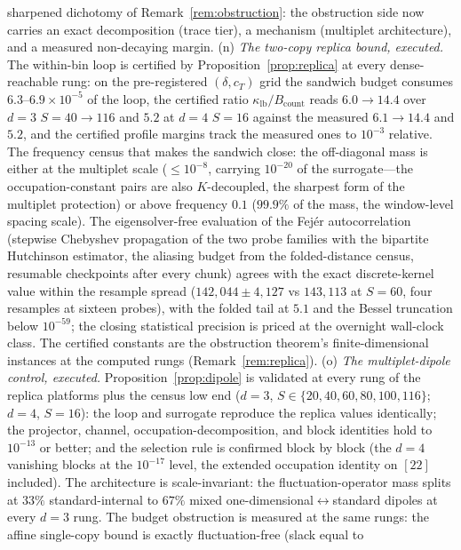 \begin{remark}
sharpened dichotomy of Remark~\ref{rem:obstruction}: the obstruction
side now carries an exact decomposition (trace tier), a mechanism
(multiplet architecture), and a measured non-decaying margin.
(n) \emph{The two-copy replica bound, executed.} The within-bin loop is
certified by Proposition~\ref{prop:replica} at every dense-reachable
rung: on the pre-registered $(\delta,c_T)$ grid the sandwich budget
consumes $6.3$--$6.9\times10^{-5}$ of the loop, the certified ratio
$\kappa_{\mathrm{lb}}/B_{\mathrm{count}}$ reads $6.0\to14.4$ over $d=3$
$S=40\to116$ and $5.2$ at $d=4$ $S=16$ against the measured $6.1\to14.4$
and $5.2$, and the certified profile margins track the measured ones to
$10^{-3}$ relative. The frequency census that makes the sandwich close:
the off-diagonal mass is either at the multiplet scale ($\le10^{-8}$,
carrying $10^{-20}$ of the surrogate---the occupation-constant pairs are
also $K$-decoupled, the sharpest form of the multiplet protection) or
above frequency $0.1$ ($99.9\%$ of the mass, the window-level spacing
scale). The eigensolver-free evaluation of the Fej\'er autocorrelation
(stepwise Chebyshev propagation of the two probe families with the
bipartite Hutchinson estimator, the aliasing budget from the
folded-distance census, resumable checkpoints after every chunk) agrees
with the exact discrete-kernel value within the resample spread
($142{,}044\pm4{,}127$ vs $143{,}113$ at $S=60$, four resamples at
sixteen probes), with the folded tail at $5.1$ and the Bessel truncation
below $10^{-59}$; the closing statistical precision is priced at the
overnight wall-clock class. The certified constants are the obstruction
theorem's finite-dimensional instances at the computed rungs
(Remark~\ref{rem:replica}).
(o) \emph{The multiplet-dipole control, executed.}
Proposition~\ref{prop:dipole} is validated at every rung of the replica
platforms plus the census low end ($d=3$, $S\in\{20,40,60,80,100,116\}$;
$d=4$, $S=16$): the loop and surrogate reproduce the replica values
identically; the projector, channel, occupation-decomposition, and block
identities hold to $10^{-13}$ or better; and the selection rule is
confirmed block by block (the $d=4$ vanishing blocks at the
$10^{-17}$ level, the extended occupation identity on $[22]$ included).
The architecture is scale-invariant: the fluctuation-operator mass splits
at $33\%$ standard-internal to $67\%$ mixed
one-dimensional$\leftrightarrow$standard dipoles at every $d=3$ rung.
The budget obstruction is measured at the same rungs: the affine
single-copy bound is exactly fluctuation-free (slack equal to

\end{remark}
